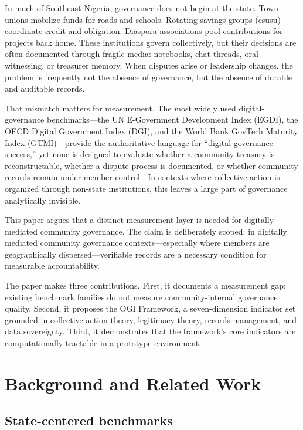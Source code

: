\documentclass[sigconf]{acmart}
\begin{document}
In much of Southeast Nigeria, governance does not begin at the state. Town unions mobilize funds for roads and schools. Rotating savings groups (esusu) coordinate credit and obligation. Diaspora associations pool contributions for projects back home. These institutions govern collectively, but their decisions are often documented through fragile media: notebooks, chat threads, oral witnessing, or treasurer memory. When disputes arise or leadership changes, the problem is frequently not the absence of governance, but the absence of durable and auditable records.

That mismatch matters for measurement. The most widely used digital-governance benchmarks---the UN E-Government Development Index (EGDI), the OECD Digital Government Index (DGI), and the World Bank GovTech Maturity Index (GTMI)---provide the authoritative language for ``digital governance success,'' yet none is designed to evaluate whether a community treasury is reconstructable, whether a dispute process is documented, or whether community records remain under member control \cite{un2024,oecd2024,wb2025}. In contexts where collective action is organized through non-state institutions, this leaves a large part of governance analytically invisible.

This paper argues that a distinct measurement layer is needed for digitally mediated community governance. The claim is deliberately scoped: in digitally mediated community governance contexts---especially where members are geographically dispersed---verifiable records are a necessary condition for measurable accountability.

The paper makes three contributions. First, it documents a measurement gap: existing benchmark families do not measure community-internal governance quality. Second, it proposes the OGI Framework, a seven-dimension indicator set grounded in collective-action theory, legitimacy theory, records management, and data sovereignty. Third, it demonstrates that the framework's core indicators are computationally tractable in a prototype environment.

\section{Background and Related Work}

\subsection{State-centered benchmarks}
\end{document}
